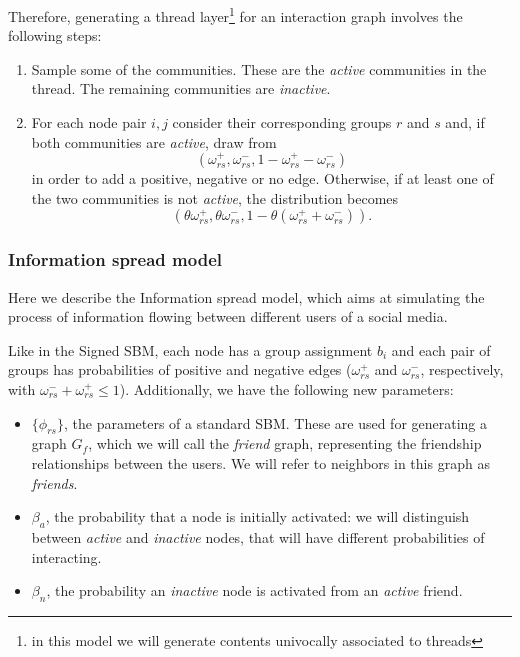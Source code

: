 Therefore, generating a thread layer\footnote{in this model we will generate
	contents univocally associated to threads} for an interaction graph
involves the following steps:
\begin{enumerate}
	\item Sample some of the communities. These are the
	      \emph{active} communities in the thread. The remaining communities
	      are \emph{inactive}.
	\item For each node pair $i, j$ consider their corresponding groups $r$ and
	      $s$ and, if both communities are \emph{active},
	      draw from
	      \begin{equation*}
		      (\omega _{rs} ^{+}, \omega _{rs} ^{-}, 1 - \omega _{rs} ^{+} - \omega _{rs} ^{-})
	      \end{equation*}
	      in order to add a positive,
	      negative or no edge.
	      Otherwise, if at least one of the
	      two communities is not \emph{active}, the distribution becomes
	      \begin{equation*}
		      (\theta \omega _{rs} ^{+}, \theta \omega _{rs} ^{-}, 1 - \theta
		      (\omega _{rs} ^{+} + \omega _{rs} ^{-})).
	      \end{equation*}

\end{enumerate}

\subsubsection{Information spread model}%
\label{ssub:information_spread_model}

Here we describe the Information spread model, which aims at simulating the
process of information flowing between different users of a social media.

Like in the Signed SBM, each node has a group assignment $b_i$ and
each pair of groups has probabilities of
positive and negative edges ($\omega _{rs}^{+}  $ and $\omega _{rs}^{-}  $,
respectively, with $\omega ^{-} _{rs} + \omega ^{+} _{rs}
	\leq 1$).
Additionally, we have the following new parameters:

\begin{itemize}
	\item $\{\phi_{rs} \}$, the parameters of a standard SBM. These are used for
	      generating a graph $G_f$, which we will call the \emph{friend} graph,
	      representing the friendship relationships between the users. We will
	      refer to neighbors in this graph as \emph{friends}.
	\item $\beta _a$, the probability that a node is initially activated: we
	      will distinguish between \emph{active} and \emph{inactive} nodes, that will have
	      different probabilities of interacting.
	\item $\beta _n$, the probability an \emph{inactive} node is activated
	      from an \emph{active} friend.
\end{itemize}

